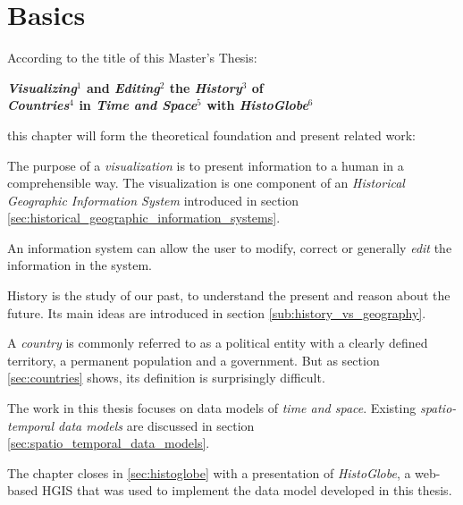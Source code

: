 
\chapter{Basics} %
\label{cha:basics}

According to the title of this Master's Thesis:

\vspace{-1em}
\begin{large}
\begin{center}
  \textbf{
    \emph{Visualizing}$^1$ and \emph{Editing}$^2$ the \emph{History}$^3$ of\\
    \emph{Countries}$^4$ in \emph{Time and Space}$^5$ with \emph{HistoGlobe}$^6$
  }
\end{center}
\end{large}
\vspace{-1em}

this chapter will form the theoretical foundation and present related work:

\begin{description}[labelindent=1.53em]
  \item[$^1$] The purpose of a \emph{visualization} is to present information to a human in a comprehensible way. The visualization is one component of an \emph{Historical Geographic Information System} introduced in section \ref{sec:historical_geographic_information_systems}.
  \item[$^2$] An information system can allow the user to modify, correct or generally \emph{edit} the information in the system.
  \item[$^3$] History is the study of our past, to understand the present and reason about the future. Its main ideas are introduced in section \ref{sub:history_vs_geography}.
  \item[$^4$] A \emph{country} is commonly referred to as a political entity with a clearly defined territory, a permanent population and a government. But as section \ref{sec:countries} shows, its definition is surprisingly difficult.
  \item[$^5$] The work in this thesis focuses on data models of \emph{time and space}. Existing \emph{spatio-temporal data models} are discussed in section \ref{sec:spatio_temporal_data_models}.
  \item[$^6$] The chapter closes in \ref{sec:histoglobe} with a presentation of \emph{HistoGlobe}, a web-based HGIS that was used to implement the data model developed in this thesis.
\end{description}

